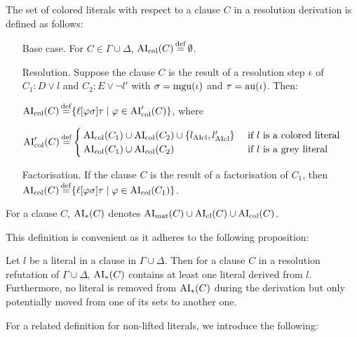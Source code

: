 \documentclass[,%
	draft=false,%
	numbers=noendperiod
	11pt,
	a4paper,
	oneside,%
	openany,
]{memoir}
\begin{document}
\begin{defi}[$\AIcol$]
	The set of colored literals with respect to a clause $C$ in a resolution derivation is defined as follows:

	\begin{itemize}
		\item[Base case.]
			For $C \in \Gamma\cup\Delta$, $\operatorname{AI}_\mathrm{col}(C) \operatorname{\stackrel{\mathrm{def}}{=}} \emptyset$.

		\item[Resolution.]
			Suppose the clause $C$ is the result of a resolution step $\iota$ of $C_1: D \lor l$ and $C_2: E \lor \lnot l'$ with $\sigma = \operatorname{mgu}(\iota)$ and $\tau = \operatorname{au}(\iota)$.
			Then:

			$\operatorname{AI}_\mathrm{col}(C) \operatorname{\stackrel{\mathrm{def}}{=}} \{ \ell[\varphi\sigma]\tau \mid \varphi \in \operatorname{AI}_\mathrm{col}'(C) \}$, where

			$\operatorname{AI}_\mathrm{col}'(C) \operatorname{\stackrel{\mathrm{def}}{=}}
			\begin{cases}
				\operatorname{AI}_\mathrm{col}(C_1) \cup \operatorname{AI}_\mathrm{col}(C_2) \cup \{ l_{\operatorname{AIcl}}, l'_{\operatorname{AIcl}} \}  & \text{ if $l$ is a colored literal} \\
				\operatorname{AI}_\mathrm{col}(C_1) \cup \operatorname{AI}_\mathrm{col}(C_2) & \text{ if $l$ is a grey literal}
			\end{cases} $

		\item[Factorisation.]
			If the clause $C$ is the result of a factorisation of $C_1$, then
			$\operatorname{AI}_\mathrm{col}(C) \operatorname{\stackrel{\mathrm{def}}{=}} \{ \ell[\varphi\sigma]\tau \mid \varphi \in \operatorname{AI}_\mathrm{col}(C_1) \}$.
			\qedhere
	\end{itemize}
\end{defi}

\begin{defi}[$\AIany$]
	For a clause $C$, $\operatorname{AI}_\mathrm{*}(C)$ denotes $\operatorname{AI}_\mathrm{mat}(C) \cup \operatorname{AI}_\mathrm{cl}(C) \cup \operatorname{AI}_\mathrm{col}(C)$.
\end{defi}

This definition is convenient as it adheres to the following proposition:

\begin{remark}
	Let $l$ be a literal in a clause in $\Gamma \cup \Delta$.
	Then for a clause $C$ in a resolution refutation of $\Gamma\cup\Delta$,
	$\operatorname{AI}_\mathrm{*}(C)$ contains at least one literal derived from $l$.
	Furthermore, no literal is removed from $\operatorname{AI}_\mathrm{*}(C)$ during the derivation but only potentially moved from one of its sets to another one.  
\end{remark}

For a related definition for non-lifted literals, we introduce the following:
\end{document}
